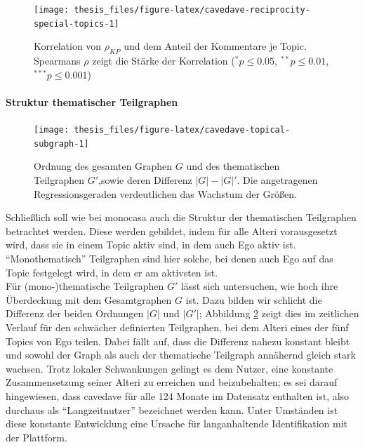 \documentclass[11pt,a4paper,twoside]{article}
\let\oldpar\paragraph
\renewcommand{\paragraph}{\oldpar*}
\begin{document}
\begin{figure}

{\centering \texttt{[image: thesis\_files/figure-latex/cavedave-reciprocity-special-topics-1]} 

}

\caption{Korrelation von \(\rho_{KP}\)
und dem Anteil der Kommentare je Topic. Spearmans \(\rho\) zeigt die
Stärke der Korrelation (\(^{*}p\le0.05\), \(^{**}p\le0.01\),
\(^{***}p\le0.001\))}\label{fig:cavedave-reciprocity-special-topics}
\end{figure}

\hypertarget{struktur-thematischer-teilgraphen}{%
\paragraph{Struktur thematischer
Teilgraphen}\label{struktur-thematischer-teilgraphen}}






\begin{figure}

{\centering \texttt{[image: thesis\_files/figure-latex/cavedave-topical-subgraph-1]} 

}

\caption{Ordnung des gesamten Graphen \(G\) und
des thematischen Teilgraphen \(G'\),sowie deren Differenz
\(|G| - |G|'\). Die angetragenen Regressionsgeraden verdeutlichen das
Wachstum der Größen.}\label{fig:cavedave-topical-subgraph}
\end{figure}

Schließlich soll wie bei monocasa auch die Struktur der thematischen
Teilgraphen betrachtet werden. Diese werden gebildet, indem für alle
Alteri vorausgesetzt wird, dass sie in einem Topic aktiv sind, in dem
auch Ego aktiv ist. \enquote{Monothematisch} Teilgraphen sind hier
solche, bei denen auch Ego auf das Topic festgelegt wird, in dem er am
aktivsten ist.\\
Für (mono-)thematische Teilgraphen \(G'\) lässt sich untersuchen, wie
hoch ihre Überdeckung mit dem Gesamtgraphen \(G\) ist. Dazu bilden wir
schlicht die Differenz der beiden Ordnungen \(|G|\) und \(|G'|\);
Abbildung \ref{fig:cavedave-topical-subgraph} zeigt dies im zeitlichen
Verlauf für den schwächer definierten Teilgraphen, bei dem Alteri eines
der fünf Topics von Ego teilen. Dabei fällt auf, dass die Differenz
nahezu konstant bleibt und sowohl der Graph als auch der thematische
Teilgraph annähernd gleich stark wachsen. Trotz lokaler Schwankungen
gelingt es dem Nutzer, eine konstante Zusammensetzung seiner Alteri zu
erreichen und beizubehalten; es sei darauf hingewiesen, dass cavedave
für alle 124 Monate im Datensatz enthalten ist, also durchaus als
\enquote{Langzeitnutzer} bezeichnet werden kann. Unter Umständen ist
diese konstante Entwicklung eine Ursache für langanhaltende
Identifikation mit der Plattform.
\end{document}
